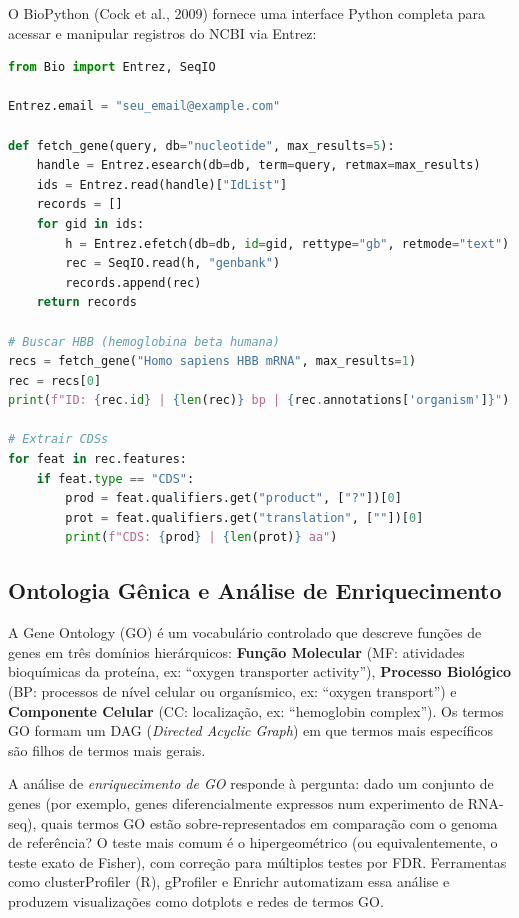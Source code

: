 O BioPython (Cock et al., 2009) fornece uma interface Python completa para acessar e
manipular registros do NCBI via Entrez:

\begin{lstlisting}[language=Python, caption=Acesso ao GenBank via BioPython]
from Bio import Entrez, SeqIO

Entrez.email = "seu_email@example.com"

def fetch_gene(query, db="nucleotide", max_results=5):
    handle = Entrez.esearch(db=db, term=query, retmax=max_results)
    ids = Entrez.read(handle)["IdList"]
    records = []
    for gid in ids:
        h = Entrez.efetch(db=db, id=gid, rettype="gb", retmode="text")
        rec = SeqIO.read(h, "genbank")
        records.append(rec)
    return records

# Buscar HBB (hemoglobina beta humana)
recs = fetch_gene("Homo sapiens HBB mRNA", max_results=1)
rec = recs[0]
print(f"ID: {rec.id} | {len(rec)} bp | {rec.annotations['organism']}")

# Extrair CDSs
for feat in rec.features:
    if feat.type == "CDS":
        prod = feat.qualifiers.get("product", ["?"])[0]
        prot = feat.qualifiers.get("translation", [""])[0]
        print(f"CDS: {prod} | {len(prot)} aa")
\end{lstlisting}

\subsection{Ontologia Gênica e Análise de Enriquecimento}

A Gene Ontology (GO) é um vocabulário controlado que descreve funções de genes em três
domínios hierárquicos: \textbf{Função Molecular} (MF: atividades bioquímicas da proteína,
ex: ``oxygen transporter activity''), \textbf{Processo Biológico} (BP: processos de nível
celular ou organísmico, ex: ``oxygen transport'') e \textbf{Componente Celular} (CC:
localização, ex: ``hemoglobin complex''). Os termos GO formam um DAG (\textit{Directed
Acyclic Graph}) em que termos mais específicos são filhos de termos mais gerais.

A análise de \emph{enriquecimento de GO} responde à pergunta: dado um conjunto de genes
(por exemplo, genes diferencialmente expressos num experimento de RNA-seq), quais termos
GO estão sobre-representados em comparação com o genoma de referência? O teste mais comum
é o hipergeométrico (ou equivalentemente, o teste exato de Fisher), com correção para
múltiplos testes por FDR. Ferramentas como clusterProfiler (R), gProfiler e Enrichr
automatizam essa análise e produzem visualizações como dotplots e redes de termos GO.

